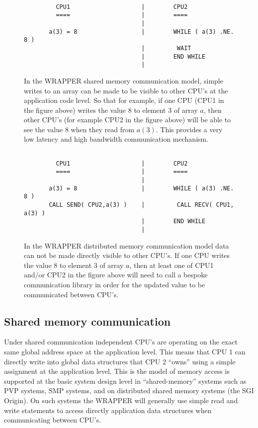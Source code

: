 \begin{figure}
\begin{verbatim}

         CPU1                    |        CPU2
         ====                    |        ====
                                 |
       a(3) = 8                  |        WHILE ( a(3) .NE. 8 ) 
                                 |         WAIT
                                 |        END WHILE
                                 |
\end{verbatim}
\caption{ In the WRAPPER shared memory communication model, simple writes to an
array can be made to be visible to other CPU's at the application code level.
So that for example, if one CPU (CPU1 in the figure above) writes the value $8$ to 
element $3$ of array $a$, then other CPU's (for example CPU2 in the figure above)
will be able to see the value $8$ when they read from $a(3)$.
This provides a very low latency and high bandwidth communication 
mechanism.
} \label{fig:simple_assign}
\end{figure}

\begin{figure}
\begin{verbatim}

         CPU1                    |        CPU2
         ====                    |        ====
                                 |
       a(3) = 8                  |        WHILE ( a(3) .NE. 8 )
       CALL SEND( CPU2,a(3) )    |         CALL RECV( CPU1, a(3) )
                                 |        END WHILE
                                 |
\end{verbatim}
\caption{ In the WRAPPER distributed memory communication model
data can not be made directly visible to other CPU's.
If one CPU writes the value $8$ to element $3$ of array $a$, then
at least one of CPU1 and/or CPU2 in the figure above will need
to call a bespoke communication library in order for the updated 
value to be communicated between CPU's.
} \label{fig:comm_msg}
\end{figure}

\subsection{Shared memory communication}
\label{sect:shared_memory_communication}

Under shared communication independent CPU's are operating
on the exact same global address space at the application level.
This means that CPU 1 can directly write into global 
data structures that CPU 2 ``owns'' using a simple
assignment at the application level. 
This is the model of memory access is supported at the basic system 
design level in ``shared-memory'' systems such as PVP systems, SMP systems,
and on distributed shared memory systems (the SGI Origin).
On such systems the WRAPPER will generally use simple read and write statements 
to access directly application data structures when communicating between CPU's.

